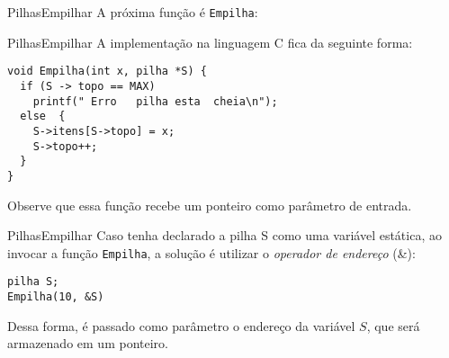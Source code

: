 \documentclass[aspectratio=169]{beamer}
\begin{document}

\begin{frame}[fragile]{Pilhas}{Empilhar}
A próxima função é \verb|Empilha|:
\begin{algorithm}[H]
\caption{Empilhar} 
\label{Empilhar}
\end{algorithm}
\end{frame}


\begin{frame}[fragile]{Pilhas}{Empilhar}
A implementação na linguagem C fica da seguinte forma:

\begin{lstlisting}[style=CStyle]
void Empilha(int x, pilha *S) { 
  if (S -> topo == MAX) 
    printf(" Erro   pilha esta  cheia\n");
  else  { 
    S->itens[S->topo] = x;   
    S->topo++; 
  }
} 
\end{lstlisting}  
Observe que essa função recebe um ponteiro como parâmetro de entrada. 
\end{frame}


\begin{frame}[fragile]{Pilhas}{Empilhar}
Caso tenha declarado a pilha S como uma variável estática, ao invocar a função \verb|Empilha|, a solução é utilizar o {\it operador de endereço} (\&):

\begin{lstlisting}[style=CStyle]
pilha S;
Empilha(10, &S) 

\end{lstlisting}  
Dessa forma, é passado como parâmetro o endereço da variável $S$, que será armazenado em um ponteiro.
\end{frame}


\end{document}
